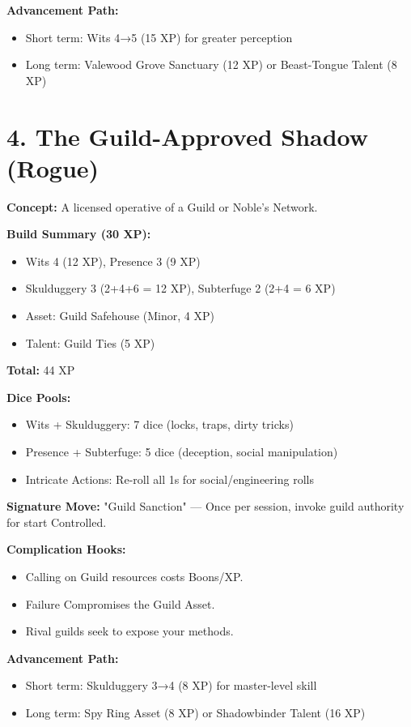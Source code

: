 \textbf{Advancement Path:}
\begin{itemize}
  \item Short term: Wits 4→5 (15 XP) for greater perception
  \item Long term: Valewood Grove Sanctuary (12 XP) or Beast-Tongue Talent (8 XP)
\end{itemize}

\section{4. The Guild-Approved Shadow (Rogue)}

\textbf{Concept:} A licensed operative of a Guild or Noble's Network.

\textbf{Build Summary (30 XP):}
\begin{itemize}
  \item Wits 4 (12 XP), Presence 3 (9 XP)
  \item Skulduggery 3 (2+4+6 = 12 XP), Subterfuge 2 (2+4 = 6 XP)
  \item Asset: Guild Safehouse (Minor, 4 XP)
  \item Talent: Guild Ties (5 XP)
\end{itemize}
\textbf{Total:} 44 XP

\textbf{Dice Pools:}
\begin{itemize}
  \item Wits + Skulduggery: 7 dice (locks, traps, dirty tricks)
  \item Presence + Subterfuge: 5 dice (deception, social manipulation)
  \item Intricate Actions: Re-roll all 1s for social/engineering rolls
\end{itemize}

\textbf{Signature Move:} "Guild Sanction" — Once per session, invoke guild authority for start Controlled.

\textbf{Complication Hooks:}
\begin{itemize}
  \item Calling on Guild resources costs Boons/XP.
  \item Failure Compromises the Guild Asset.
  \item Rival guilds seek to expose your methods.
\end{itemize}

\textbf{Advancement Path:}
\begin{itemize}
  \item Short term: Skulduggery 3→4 (8 XP) for master-level skill
  \item Long term: Spy Ring Asset (8 XP) or Shadowbinder Talent (16 XP)
\end{itemize}

